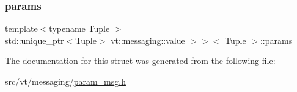 \subsubsection{\texorpdfstring{params}{params}}
{\footnotesize\ttfamily template$<$typename Tuple $>$ \\
std\+::unique\+\_\+ptr$<$Tuple$>$ vt\+::messaging\+::value $>$$>$$<$ Tuple $>$\+::params}



The documentation for this struct was generated from the following file\+:\begin{DoxyCompactItemize}
\item 
src/vt/messaging/\hyperlink{param__msg_8h}{param\+\_\+msg.\+h}\end{DoxyCompactItemize}
